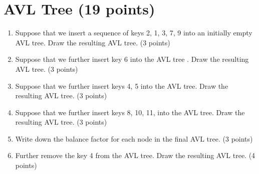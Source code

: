 \documentclass[11pt]{exam}
\begin{document}
\section{AVL Tree (19 points)}
\begin{enumerate} [1.]
\item Suppose that we insert a sequence of keys 2, 1, 3, 7, 9 into an initially empty AVL tree. Draw the resulting AVL tree. {\color{red}(3 points)}
\begin{solution}
\end{solution}

\item Suppose that we further insert key 6 into the AVL tree . Draw the resulting AVL tree. {\color{red}(3 points)}
\begin{solution}
\end{solution}

\item Suppose that we further insert keys 4, 5 into the AVL tree. Draw the resulting AVL tree. {\color{red}(3 points)}
\begin{solution}
\end{solution}

\item Suppose that we further insert keys 8, 10, 11, into the AVL tree. Draw the
resulting AVL tree. {\color{red}(3 points)}
\begin{solution}
\end{solution}

\item Write down the balance factor for each node in the final AVL tree. {\color{red}(3 points)}
\begin{solution}
\end{solution}

\item Further remove the key 4 from the AVL tree. Draw the resulting AVL tree. {\color{red}(4 points)}
\begin{solution}
\end{solution}
\end{enumerate}
\end{document}
